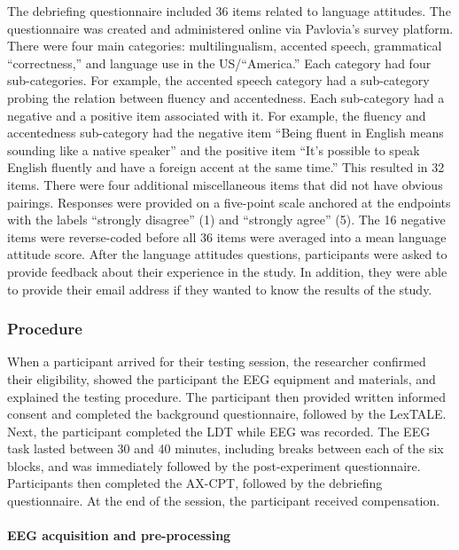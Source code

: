\documentclass[
  12pt,
  twoside]{article}
\begin{document}
The debriefing questionnaire included 36 items related to language attitudes.
The questionnaire was created and administered online via Pavlovia's survey platform.
There were four main categories: multilingualism, accented speech, grammatical ``correctness,'' and language use in the US/``America.''
Each category had four sub-categories.
For example, the accented speech category had a sub-category probing the relation between fluency and accentedness.
Each sub-category had a negative and a positive item associated with it.
For example, the fluency and accentedness sub-category had the negative item ``Being fluent in English means sounding like a native speaker'' and the positive item ``It's possible to speak English fluently and have a foreign accent at the same time.''
This resulted in 32 items.
There were four additional miscellaneous items that did not have obvious pairings.
Responses were provided on a five-point scale anchored at the endpoints with the labels ``strongly disagree'' (1) and ``strongly agree'' (5).
The 16 negative items were reverse-coded before all 36 items were averaged into a mean language attitude score.
After the language attitudes questions, participants were asked to provide feedback about their experience in the study.
In addition, they were able to provide their email address if they wanted to know the results of the study.

\hypertarget{procedure}{%
\subsubsection{Procedure}\label{procedure}}

When a participant arrived for their testing session, the researcher confirmed their eligibility, showed the participant the EEG equipment and materials, and explained the testing procedure.
The participant then provided written informed consent and completed the background questionnaire, followed by the LexTALE.
Next, the participant completed the LDT while EEG was recorded.
The EEG task lasted between 30 and 40 minutes, including breaks between each of the six blocks, and was immediately followed by the post-experiment questionnaire.
Participants then completed the AX-CPT, followed by the debriefing questionnaire.
At the end of the session, the participant received compensation.

\hypertarget{methods-eeg}{%
\paragraph{EEG acquisition and pre-processing}\label{methods-eeg}}
\end{document}
